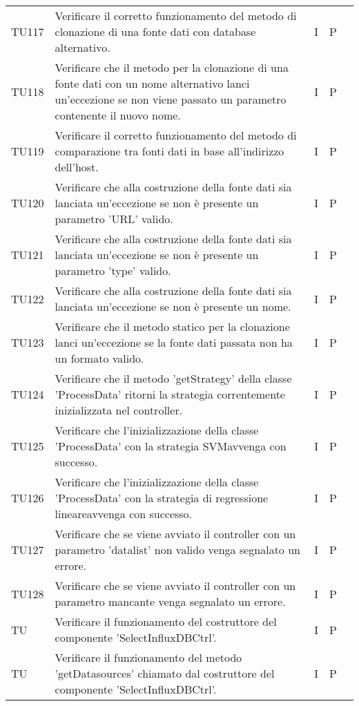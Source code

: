 \begin{longtable} {
		>{}p{15mm} 
		>{}p{79.5mm}
		>{}p{15mm} 
		>{}p{15mm}
		>{}p{0mm}}
	TU117		& Verificare il corretto funzionamento del metodo di clonazione di una fonte dati con database alternativo. & I & P &\TBstrut \\ [2mm]
	TU118		& Verificare che il metodo per la clonazione di una fonte dati con un nome alternativo lanci un'eccezione se non viene passato un parametro contenente il nuovo nome.& I & P &\TBstrut \\ [2mm]
	TU119		& Verificare il corretto funzionamento del metodo di comparazione tra fonti dati in base all'indirizzo dell'host. & I & P &\TBstrut \\ [2mm]
	TU120		& Verificare che alla costruzione della fonte dati sia lanciata un'eccezione se non è presente un parametro 'URL' valido.& I & P &\TBstrut \\ [2mm]
	TU121		& Verificare che alla costruzione della fonte dati sia lanciata un'eccezione se non è presente un parametro 'type' valido.& I & P &\TBstrut \\ [2mm]
	TU122		& Verificare che alla costruzione della fonte dati sia lanciata un'eccezione se non è presente un nome.& I & P &\TBstrut \\ [2mm]
	TU123		& Verificare che il metodo statico per la clonazione lanci un'eccezione se la fonte dati passata non ha un formato valido. & I & P &\TBstrut \\ [2mm]
	TU124		& Verificare che il metodo 'getStrategy' della classe 'ProcessData' ritorni la strategia correntemente inizializzata nel controller. & I & P &\TBstrut \\ [2mm]
	TU125		& Verificare che l'inizializzazione della classe 'ProcessData' con la strategia SVM\glosp avvenga con successo. & I & P &\TBstrut \\ [2mm]
	TU126		& Verificare che l'inizializzazione della classe 'ProcessData' con la strategia di regressione lineare\glosp avvenga con successo. & I & P &\TBstrut \\ [2mm]
	TU127		& Verificare che se viene avviato il controller con un parametro 'datalist' non valido venga segnalato un errore. & I & P &\TBstrut \\ [2mm]
	TU128		& Verificare che se viene avviato il controller con un parametro mancante venga segnalato un errore. & I & P &\TBstrut \\ [2mm]
	TU		& Verificare il funzionamento del costruttore del componente 'SelectInfluxDBCtrl'.& I & P &\TBstrut \\ [2mm]
	TU		& Verificare il funzionamento del metodo 'getDatasources' chiamato dal costruttore del componente 'SelectInfluxDBCtrl'.& I & P &\TBstrut \\ [2mm]

\end{longtable}
